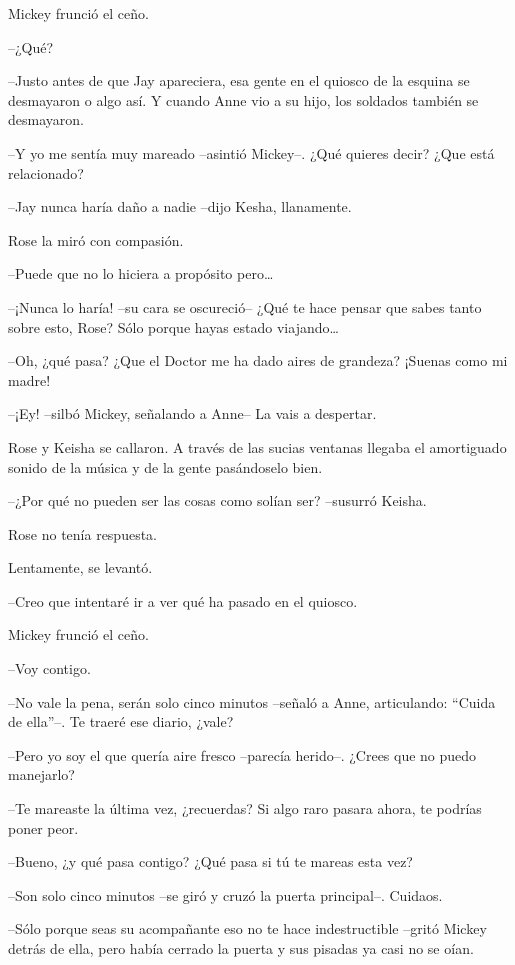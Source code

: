 {Mickey frunció el ceño.}

{--¿Qué?}

{--Justo antes de que Jay apareciera, esa gente en el quiosco de la
 esquina se desmayaron o algo así. Y cuando Anne vio a su hijo, los
soldados también se desmayaron.}

{--Y yo me sentía muy mareado --asintió Mickey--. ¿Qué quieres decir?
¿Que está relacionado?}

{--Jay nunca haría daño a nadie --dijo Kesha, llanamente.}

{Rose la miró con compasión.}

{--Puede que no lo hiciera a propósito pero\ldots{}}

{--¡Nunca lo haría! --su cara se oscureció-- ¿Qué te hace pensar que
 sabes tanto sobre esto, Rose? Sólo porque hayas estado viajando\ldots{}}

{--Oh, ¿qué pasa? ¿Que el Doctor me ha dado aires de grandeza? ¡Suenas
como mi madre!}

{--¡Ey! --silbó Mickey, señalando a Anne-- La vais a despertar.}

{Rose y Keisha se callaron. A través de las sucias ventanas llegaba el
amortiguado sonido de la música y de la gente pasándoselo bien.}

{--¿Por qué no pueden ser las cosas como solían ser? --susurró Keisha.}

{Rose no tenía respuesta.}

{Lentamente, se levantó.}

{--Creo que intentaré ir a ver qué ha pasado en el quiosco.}

{Mickey frunció el ceño.}

{--Voy contigo.}

{--No vale la pena, serán solo cinco minutos --señaló a Anne,
articulando: ``Cuida de ella''--. Te traeré ese diario, ¿vale?}

{--Pero yo soy el que quería aire fresco --parecía herido--. ¿Crees que
no puedo manejarlo?}

{--Te mareaste la última vez, ¿recuerdas? Si algo raro pasara ahora, te
podrías poner peor.}

{--Bueno, ¿y qué pasa contigo? ¿Qué pasa si tú te mareas esta vez?}

{--Son solo cinco minutos --se giró y cruzó la puerta principal--.
Cuidaos.}

{--Sólo porque seas su acompañante eso no te hace indestructible --gritó
 Mickey detrás de ella, pero había cerrado la puerta y sus pisadas ya
casi no se oían.}

